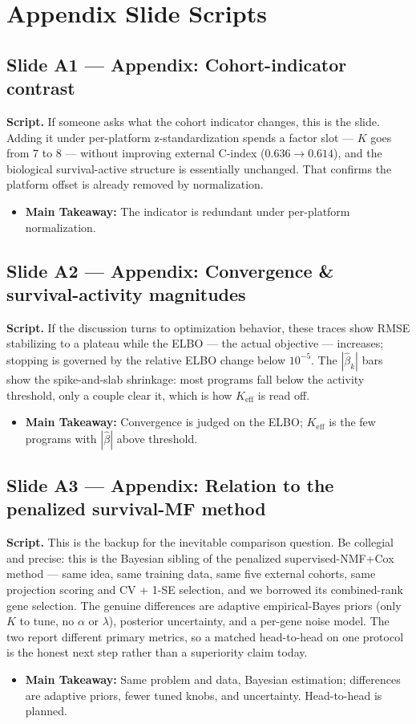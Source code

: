 \documentclass[11pt]{article}
\newcommand{\scriptlabel}{\textbf{Script. }}
\newcommand{\sectionlabel}[1]{\textbf{#1}}
\begin{document}
\section*{Appendix Slide Scripts}

\subsection*{Slide A1 --- Appendix: Cohort-indicator contrast}
\scriptlabel If someone asks what the cohort indicator changes, this is the slide. Adding it under
per-platform z-standardization spends a factor slot --- $K$ goes from 7 to 8 --- without improving
external C-index ($0.636 \to 0.614$), and the biological survival-active structure is essentially
unchanged. That confirms the platform offset is already removed by normalization.

\begin{itemize}
\item \sectionlabel{Main Takeaway:} The indicator is redundant under per-platform normalization.
\end{itemize}

\subsection*{Slide A2 --- Appendix: Convergence \& survival-activity magnitudes}
\scriptlabel If the discussion turns to optimization behavior, these traces show RMSE stabilizing to
a plateau while the ELBO --- the actual objective --- increases; stopping is governed by the relative
ELBO change below $10^{-5}$. The $|\hat\beta_k|$ bars show the spike-and-slab shrinkage: most programs
fall below the activity threshold, only a couple clear it, which is how $K_{\text{eff}}$ is read off.

\begin{itemize}
\item \sectionlabel{Main Takeaway:} Convergence is judged on the ELBO; $K_{\text{eff}}$ is the few
programs with $|\hat\beta|$ above threshold.
\end{itemize}

\subsection*{Slide A3 --- Appendix: Relation to the penalized survival-MF method}
\scriptlabel This is the backup for the inevitable comparison question. Be collegial and precise: this
is the Bayesian sibling of the penalized supervised-NMF+Cox method --- same idea, same training data,
same five external cohorts, same projection scoring and CV + 1-SE selection, and we borrowed its
combined-rank gene selection. The genuine differences are adaptive empirical-Bayes priors (only $K$ to
tune, no $\alpha$ or $\lambda$), posterior uncertainty, and a per-gene noise model. The two report
different primary metrics, so a matched head-to-head on one protocol is the honest next step rather
than a superiority claim today.

\begin{itemize}
\item \sectionlabel{Main Takeaway:} Same problem and data, Bayesian estimation; differences are
adaptive priors, fewer tuned knobs, and uncertainty. Head-to-head is planned.
\end{itemize}
\end{document}
